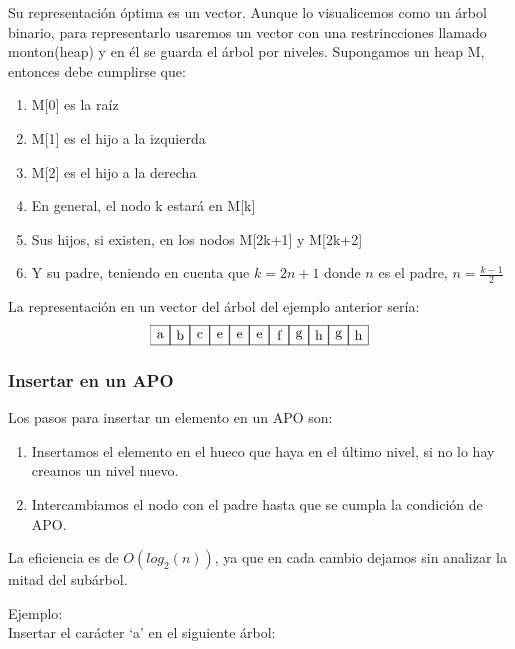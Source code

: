 \documentclass[10pt,a4paper,spanish]{report}
\begin{document}
\noindent
Su representación óptima es un vector. Aunque lo visualicemos como un árbol binario, para representarlo usaremos  un vector con una restrincciones llamado monton(heap) y en él se guarda el árbol por niveles. 
Supongamos un heap  M, entonces debe cumplirse que:
\begin{enumerate}[$\heartsuit$]
      \item M[0] es la raíz
      \item M[1] es el hijo a la izquierda
      \item M[2] es el hijo a la derecha
      \item En general, el nodo k estará en M[k]
      \item Sus hijos, si existen, en los nodos M[2k+1] y M[2k+2]
      \item Y su padre, teniendo en cuenta que $k=2n+1$ donde $n$ es el padre, $n=\frac{k-1}{2}$
\end{enumerate}

\noindent
La representación en un vector del árbol del ejemplo anterior sería:
\[\begin{xy}
,(0,0)*+=<5mm>[F]\txt<0.5cm>{a}
,(5,0)*+=<5mm>[F]\txt<0.5cm>{b}
,(10,0)*+=<5mm>[F]\txt<0.5cm>{c}
,(15,0)*+=<5mm>[F]\txt<0.5cm>{e}
,(20,0)*+=<5mm>[F]\txt<0.5cm>{e}
,(25,0)*+=<5mm>[F]\txt<0.5cm>{e}
,(30,0)*+=<5mm>[F]\txt<0.5cm>{f}
,(35,0)*+=<5mm>[F]\txt<0.5cm>{g}
,(40,0)*+=<5mm>[F]\txt<0.5cm>{h}
,(45,0)*+=<5mm>[F]\txt<0.5cm>{g}
,(50,0)*+=<5mm>[F]\txt<0.5cm>{h}
\end{xy}\]

\subsubsection{\textcolor[rgb]{0.3,0.4,0.8}Insertar en un APO}
\noindent
Los pasos para insertar un elemento en un APO son:
\begin{enumerate}
      \item Insertamos el elemento en el hueco que haya en el último nivel, si no lo hay creamos un nivel nuevo.
      \item Intercambiamos el nodo con el padre hasta que se cumpla la condición de APO.
\end{enumerate}

\noindent
La eficiencia es de $O(log_2(n))$, ya que en cada cambio dejamos sin analizar la mitad del subárbol.

\noindent
Ejemplo: \\
Insertar el carácter `a' en el siguiente árbol:
\end{document}
